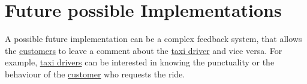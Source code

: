 	\section{Future possible Implementations}
	A possible future implementation can be a complex feedback system, that allows the \hyperref[sec:customer]{customers} to leave a comment about the \hyperref[sec:tdriver]{taxi driver} and vice versa.
	For example, \hyperref[sec:tdriver]{taxi drivers} can be interested in knowing the punctuality or the behaviour of the \hyperref[sec:customer]{customer} who requests the ride.